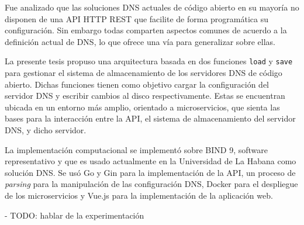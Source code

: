\begin{conclusions}
Fue analizado que las soluciones DNS actuales de código abierto en su mayoría no disponen de una API HTTP REST que facilite de forma programática su configuración. Sin embargo todas comparten aspectos comunes de acuerdo a la definición actual de DNS, lo que ofrece una vía para generalizar sobre ellas.

La presente tesis propuso una arquitectura basada en dos funciones \verb|load| y \verb|save| para gestionar el sistema de almacenamiento de los servidores DNS de código abierto. Dichas funciones tienen como objetivo cargar la configuración del servidor DNS y escribir cambios al disco respectivamente. Estas se encuentran ubicada en un entorno más amplio, orientado a microservicios, que sienta las bases para la interacción entre la API, el sistema de almacenamiento del servidor DNS, y dicho servidor.

La implementación computacional se implementó sobre BIND 9, software representativo y que es usado actualmente en la Universidad de La Habana como solución DNS. Se usó Go y Gin para la implementación de la API, un proceso de \textit{parsing} para la manipulación de las configuración DNS, Docker para el despliegue de los microservicios y Vue.js para la implementación de la aplicación web.

- TODO: hablar de la experimentación
\end{conclusions}
